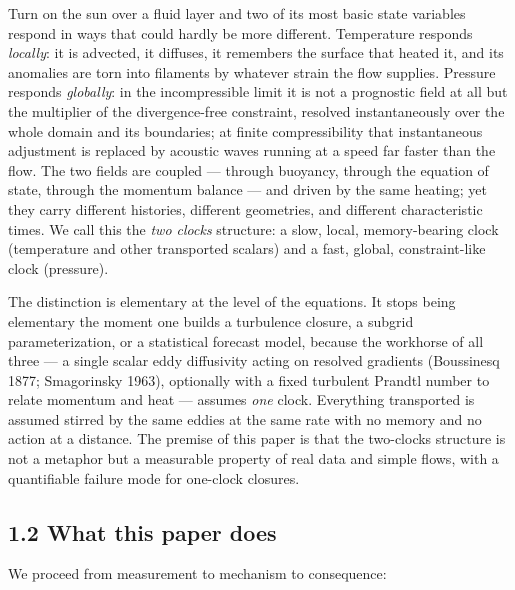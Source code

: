 \documentclass[aps,prfluids,preprint,superscriptaddress,nofootinbib]{revtex4-2}
\begin{document}
Turn on the sun over a fluid layer and two of its most basic state variables respond in ways that could hardly be more different. Temperature responds \emph{locally}: it is advected, it diffuses, it remembers the surface that heated it, and its anomalies are torn into filaments by whatever strain the flow supplies. Pressure responds \emph{globally}: in the incompressible limit it is not a prognostic field at all but the multiplier of the divergence-free constraint, resolved instantaneously over the whole domain and its boundaries; at finite compressibility that instantaneous adjustment is replaced by acoustic waves running at a speed far faster than the flow. The two fields are coupled --- through buoyancy, through the equation of state, through the momentum balance --- and driven by the same heating; yet they carry different histories, different geometries, and different characteristic times. We call this the \emph{two clocks} structure: a slow, local, memory-bearing clock (temperature and other transported scalars) and a fast, global, constraint-like clock (pressure).

The distinction is elementary at the level of the equations. It stops being elementary the moment one builds a turbulence closure, a subgrid parameterization, or a statistical forecast model, because the workhorse of all three --- a single scalar eddy diffusivity acting on resolved gradients (Boussinesq 1877; Smagorinsky 1963), optionally with a fixed turbulent Prandtl number to relate momentum and heat --- assumes \emph{one} clock. Everything transported is assumed stirred by the same eddies at the same rate with no memory and no action at a distance. The premise of this paper is that the two-clocks structure is not a metaphor but a measurable property of real data and simple flows, with a quantifiable failure mode for one-clock closures.

\subsection*{1.2 What this paper does}

We proceed from measurement to mechanism to consequence:
\end{document}
